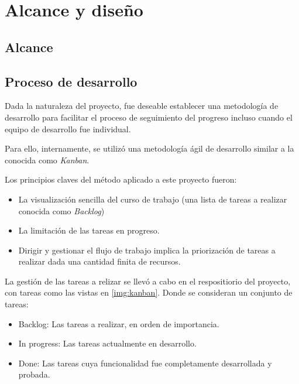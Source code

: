 \chapter{Alcance y diseño}
\label{ch:chap03}

\section{Alcance}
\label{sec:alcance}

\section{Proceso de desarrollo}
\label{sec:procdes}

Dada la naturaleza del proyecto, fue deseable establecer una metodología de desarrollo para facilitar el proceso de seguimiento del progreso incluso cuando el equipo de desarrollo fue individual.

Para ello, internamente, se utilizó una metodología ágil de desarrollo similar a la conocida como \textit{Kanban}.

Los principios claves del método aplicado a este proyecto fueron:
\begin{itemize}
	\item La visualización sencilla del curso de trabajo (una lista de tareas a realizar conocida como \textit{Backlog})
	\item La limitación de las tareas en progreso.
	\item Dirigir y gestionar el flujo de trabajo implica la priorización de tareas a realizar dada una cantidad finita de recursos.
\end{itemize}

La gestión de las tareas a relizar se llevó a cabo en el respositiorio del proyecto, con tareas como las vistas en \ref{img:kanban}. Donde se consideran un conjunto de tareas:

\begin{itemize}
	\item Backlog: Las tareas a realizar, en orden de importancia.
	\item In progress: Las tareas actualmente en desarrollo.
	\item Done: Las tareas cuya funcionalidad fue completamente desarrollada y probada.
\end{itemize}

